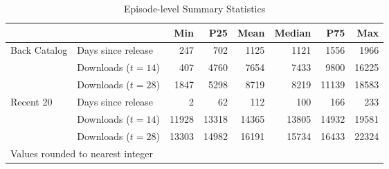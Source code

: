 \begin{table}

\caption{Episode-level Summary Statistics \label{tab:ep-summ-stats}}
\centering
\begin{tabular}[t]{llrrrrrr}
\toprule
  &    & Min & P25 & Mean & Median & P75 & Max\\
\midrule
Back Catalog & Days since release & \num{247} & \num{702} & \num{1125} & \num{1121} & \num{1556} & \num{1966}\\
 & Downloads ($t=14$) & \num{407} & \num{4760} & \num{7654} & \num{7433} & \num{9800} & \num{16225}\\
 & Downloads ($t=28$) & \num{1847} & \num{5298} & \num{8719} & \num{8219} & \num{11139} & \num{18583}\\
Recent 20 & Days since release & \num{2} & \num{62} & \num{112} & \num{100} & \num{166} & \num{233}\\
 & Downloads ($t=14$) & \num{11928} & \num{13318} & \num{14365} & \num{13805} & \num{14932} & \num{19581}\\
 & Downloads ($t=28$) & \num{13303} & \num{14982} & \num{16191} & \num{15734} & \num{16433} & \num{22324}\\
\bottomrule
\multicolumn{8}{l}{\rule{0pt}{1em}Values rounded to nearest integer}\\
\end{tabular}
\end{table}
